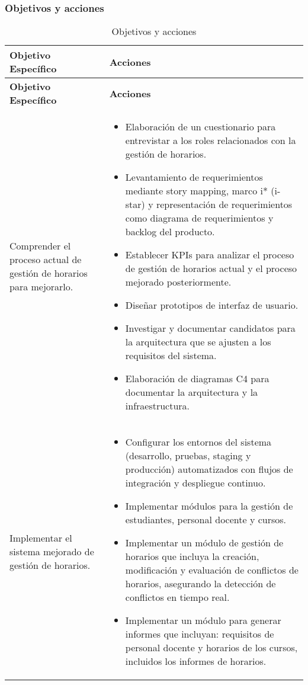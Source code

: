 \subsubsection{Objetivos y acciones}
\begin{longtable}{p{3in}|p{3in}}
\caption{Objetivos y acciones} \label{tab:objectivesNactions} \\
\hline
\textbf{Objetivo Específico} & \textbf{Acciones} \\
\hline
\endfirsthead
\hline
\textbf{Objetivo Específico} & \textbf{Acciones} \\
\hline
\endhead
\hline
\endfoot

Comprender el proceso actual de gestión de horarios para mejorarlo. &
\begin{itemize}
    \item Elaboración de un cuestionario para entrevistar a los roles relacionados con la gestión de horarios.
	\item Levantamiento de requerimientos mediante story mapping, marco i* (i-star) y representación de requerimientos como diagrama de requerimientos y backlog del producto.
	\item Establecer KPIs para analizar el proceso de gestión de horarios actual y el proceso mejorado posteriormente.
	\item Diseñar prototipos de interfaz de usuario.
    \item Investigar y documentar candidatos para la arquitectura que se ajusten a los requisitos del sistema.
	\item Elaboración de diagramas C4 para documentar la arquitectura y la infraestructura.
\end{itemize}
\\\hline

Implementar el sistema mejorado de gestión de horarios. &
\begin{itemize}
    \item Configurar los entornos del sistema (desarrollo, pruebas, staging y producción) automatizados con flujos de integración y despliegue continuo.
	\item Implementar módulos para la gestión de estudiantes, personal docente y cursos.
	\item Implementar un módulo de gestión de horarios que incluya la creación, modificación y evaluación de conflictos de horarios, asegurando la detección de conflictos en tiempo real.
	\item Implementar un módulo para generar informes que incluyan: requisitos de personal docente y horarios de los cursos, incluidos los informes de horarios.
\end{itemize}
\\\hline


\end{longtable}
